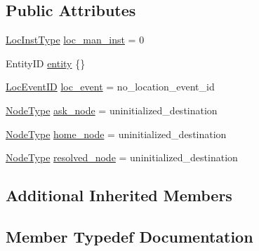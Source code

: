 \subsection*{Public Attributes}
\begin{DoxyCompactItemize}
\item 
\hyperlink{namespacevt_1_1location_a4db6456e8024af2d23fc5ae560fef866}{Loc\+Inst\+Type} \hyperlink{structvt_1_1location_1_1_location_msg_ad685e327f058d12836ed9743d44b14b7}{loc\+\_\+man\+\_\+inst} = 0
\item 
Entity\+ID \hyperlink{structvt_1_1location_1_1_location_msg_ab87a163a9f9f15780898870e0cba9b0e}{entity} \{\}
\item 
\hyperlink{namespacevt_1_1location_aa5ccc1a42aa22b0b41fcfbbdee314dca}{Loc\+Event\+ID} \hyperlink{structvt_1_1location_1_1_location_msg_a9550d842c2e1dcd3a5c48675c6b5c080}{loc\+\_\+event} = no\+\_\+location\+\_\+event\+\_\+id
\item 
\hyperlink{namespacevt_a866da9d0efc19c0a1ce79e9e492f47e2}{Node\+Type} \hyperlink{structvt_1_1location_1_1_location_msg_ab99a70172011e251d4abec4f2110fc08}{ask\+\_\+node} = uninitialized\+\_\+destination
\item 
\hyperlink{namespacevt_a866da9d0efc19c0a1ce79e9e492f47e2}{Node\+Type} \hyperlink{structvt_1_1location_1_1_location_msg_a66a5eb7dc3383f583b04d2ecf66c7222}{home\+\_\+node} = uninitialized\+\_\+destination
\item 
\hyperlink{namespacevt_a866da9d0efc19c0a1ce79e9e492f47e2}{Node\+Type} \hyperlink{structvt_1_1location_1_1_location_msg_a4c047bbd95901a1543e17e7924e1d2d3}{resolved\+\_\+node} = uninitialized\+\_\+destination
\end{DoxyCompactItemize}
\subsection*{Additional Inherited Members}


\subsection{Member Typedef Documentation}
\mbox{\label{structvt_1_1location_1_1_location_msg_a025bf9f7e29a87fbe01735e2a5db0857}} 
